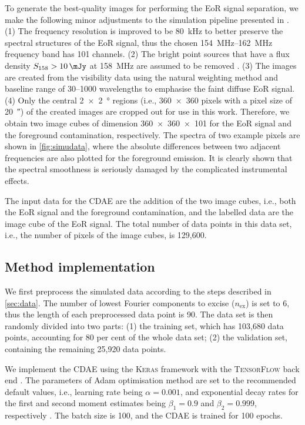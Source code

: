 \documentclass[letters,a4paper,fleqn,usenatbib]{mnras}
\newcommand{\R}[1]{\mathrm{#1}}
\begin{document}
To generate the best-quality images for performing the EoR signal
separation, we make the following minor adjustments to the simulation
pipeline presented in \citet{li2018}.
(1) The frequency resolution is improved to be \SI{80}{\kHz} to better
preserve the spectral structures of the EoR signal, thus the chosen
\SIrange{154}{162}{\MHz} frequency band has 101 channels.
(2) The bright point sources that have a flux density
$S_{158} > \SI{10}{\mJy}$ at \SI{158}{\MHz} are assumed to be
removed \citep[e.g.,][]{liu2009ps}.
(3) The images are created from the visibility data using the natural
weighting method and baseline range of \numrange{30}{1000} wavelengths
to emphasise the faint diffuse EoR signal.
(4) Only the central \SI[product-units=repeat]{2 x 2}{\degree} regions
(i.e., \num{360 x 360} pixels with a pixel size of \SI{20}{\arcsecond})
of the created images are cropped out for use in this work.
Therefore, we obtain two image cubes of dimension \num{360 x 360 x 101}
for the EoR signal and the foreground contamination, respectively.
The spectra of two example pixels are shown in \autoref{fig:simudata},
where the absolute differences between two adjacent frequencies are
also plotted for the foreground emission.
It is clearly shown that the spectral smoothness is seriously damaged
by the complicated instrumental effects.

The input data for the CDAE are the addition of the two image cubes,
i.e., both the EoR signal and the foreground contamination,
and the labelled data are the image cube of the EoR signal.
The total number of data points in this data set, i.e., the number of
pixels of the image cubes, is 129,600.


\subsection{Method implementation}
\label{sec:implementation}

We first preprocess the simulated data according to the steps described
in \autoref{sec:data}.
The number of lowest Fourier components to excise ($n_{\R{ex}}$) is
set to 6, thus the length of each preprocessed data point is 90.
The data set is then randomly divided into two parts:
(1) the training set, which has 103,680 data points, accounting for
80 per cent of the whole data set;
(2) the validation set, containing the remaining 25,920 data points.

We implement the CDAE using the \textsc{Keras} framework \citep{keras}
with the \textsc{TensorFlow} back end \citep{tensorflow}.
The parameters of Adam optimisation method are set to the recommended
default values, i.e., learning rate being $\alpha = 0.001$, and
exponential decay rates for the first and second moment estimates being
$\beta_1 = 0.9$ and $\beta_2 = 0.999$, respectively \citep{kingma2015}.
The batch size is 100, and the CDAE is trained for 100 epochs.
\end{document}

